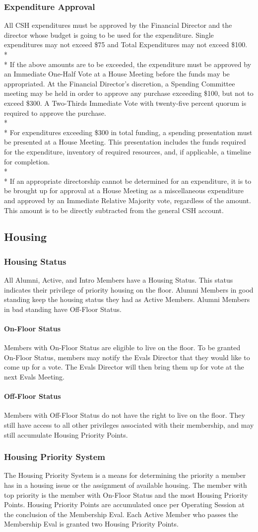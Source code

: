 \documentclass{article}
\newcommand{\asection}[1]{\subsection{#1} \label{#1}}
\newcommand{\asubsection}[1]{\subsubsection{#1} \label{#1}}
\newcommand{\asubsubsection}[1]{\paragraph{#1} \label{#1}}
\begin{document}
\asubsection{Expenditure Approval}
All CSH expenditures must be approved by the Financial Director and the director whose budget is going to be used for the expenditure.
Single expenditures may not exceed \$75 and Total Expenditures may not exceed \$100.
\\* \\*
If the above amounts are to be exceeded, the expenditure must be approved by an Immediate One-Half Vote at a House Meeting before the funds may be appropriated.
At the Financial Director's discretion, a Spending Committee meeting may be held in order to approve any purchase exceeding \$100, but not to exceed \$300.
A Two-Thirds Immediate Vote with twenty-five percent quorum is required to approve the purchase.
\\*\\*
For expenditures exceeding \$300 in total funding, a spending presentation must be presented at a House Meeting.
This presentation includes the funds required for the expenditure, inventory of required resources, and, if applicable, a timeline for completion.
\\* \\*
If an appropriate directorship cannot be determined for an expenditure, it is to be brought up for approval at a House Meeting as a miscellaneous expenditure and approved by an Immediate Relative Majority vote, regardless of the amount.
This amount is to be directly subtracted from the general CSH account.
\asection{Housing}

\asubsection{Housing Status}
All Alumni, Active, and Intro Members have a Housing Status.
This status indicates their privilege of priority housing on the floor.
Alumni Members in good standing keep the housing status they had as Active Members.
Alumni Members in bad standing have Off-Floor Status.

\asubsubsection{On-Floor Status}
Members with On-Floor Status are eligible to live on the floor.
To be granted On-Floor Status, members may notify the Evals Director that they would like to come up for a vote.
The Evals Director will then bring them up for vote at the next Evals Meeting.

\asubsubsection{Off-Floor Status}
Members with Off-Floor Status do not have the right to live on the floor.
They still have access to all other privileges associated with their membership, and may still accumulate Housing Priority Points.

\asubsection{Housing Priority System}
The Housing Priority System is a means for determining the priority a member has in a housing issue or the assignment of available housing.
The member with top priority is the member with On-Floor Status and the most Housing Priority Points.
Housing Priority Points are accumulated once per Operating Session at the conclusion of the Membership Eval.
Each Active Member who passes the Membership Eval is granted two Housing Priority Points.
\end{document}
